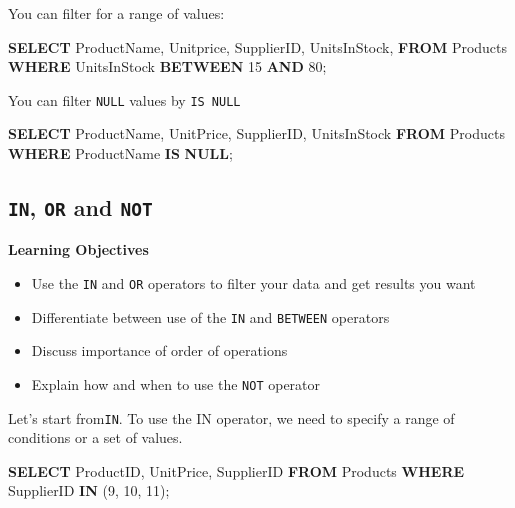 \documentclass[]{book}
\makeatletter
\newenvironment{Shaded}{\begin{snugshade}}{\end{snugshade}}
\newcommand{\KeywordTok}[1]{\textcolor[rgb]{0.13,0.29,0.53}{\textbf{{#1}}}}
\newcommand{\DecValTok}[1]{\textcolor[rgb]{0.00,0.00,0.81}{{#1}}}
\newcommand{\NormalTok}[1]{{#1}}
\providecommand{\tightlist}{%
  \setlength{\itemsep}{0pt}\setlength{\parskip}{0pt}}
\newenvironment{kframe}{%
\medskip{}
\setlength{\fboxsep}{.8em}
 \def\at@end@of@kframe{}%
 \ifinner\ifhmode%
  \def\at@end@of@kframe{\end{minipage}}%
  \begin{minipage}{\columnwidth}%
 \fi\fi%
 \def\FrameCommand##1{\hskip\@totalleftmargin \hskip-\fboxsep
 \colorbox{shadecolor}{##1}\hskip-\fboxsep
     \hskip-\linewidth \hskip-\@totalleftmargin \hskip\columnwidth}%
 \MakeFramed {\advance\hsize-\width
   \@totalleftmargin\z@ \linewidth\hsize
   \@setminipage}}%
 {\par\unskip\endMakeFramed%
 \at@end@of@kframe}
\renewenvironment{Shaded}{\begin{kframe}}{\end{kframe}}
\theoremstyle{definition}
\theoremstyle{definition}
\theoremstyle{remark}
\makeatother
\begin{document}
You can filter for a range of values:

\begin{Shaded}
\begin{Highlighting}[]
\KeywordTok{SELECT} \NormalTok{ProductName,}
\NormalTok{Unitprice,}
\NormalTok{SupplierID,}
\NormalTok{UnitsInStock,}
\KeywordTok{FROM} \NormalTok{Products}
\KeywordTok{WHERE} \NormalTok{UnitsInStock }\KeywordTok{BETWEEN} \DecValTok{15} \KeywordTok{AND} \DecValTok{80}\NormalTok{;}
\end{Highlighting}
\end{Shaded}

You can filter \texttt{NULL} values by \texttt{IS\ NULL}

\begin{Shaded}
\begin{Highlighting}[]
\KeywordTok{SELECT} \NormalTok{ProductName,}
\NormalTok{UnitPrice,}
\NormalTok{SupplierID,}
\NormalTok{UnitsInStock}
\KeywordTok{FROM} \NormalTok{Products}
\KeywordTok{WHERE} \NormalTok{ProductName }\KeywordTok{IS} \KeywordTok{NULL}\NormalTok{;}
\end{Highlighting}
\end{Shaded}

\subsection{\texorpdfstring{\texttt{IN}, \texttt{OR} and
\texttt{NOT}}{IN, OR and NOT}}\label{in-or-and-not}

\textbf{Learning Objectives}

\begin{itemize}
\tightlist
\item
  Use the \texttt{IN} and \texttt{OR} operators to filter your data and
  get results you want
\item
  Differentiate between use of the \texttt{IN} and \texttt{BETWEEN}
  operators
\item
  Discuss importance of order of operations
\item
  Explain how and when to use the \texttt{NOT} operator
\end{itemize}

Let's start from\texttt{IN}. To use the IN operator, we need to specify
a range of conditions or a set of values.

\begin{Shaded}
\begin{Highlighting}[]
\KeywordTok{SELECT}
\NormalTok{ProductID,}
\NormalTok{UnitPrice,}
\NormalTok{SupplierID}
\KeywordTok{FROM} \NormalTok{Products}
\KeywordTok{WHERE} \NormalTok{SupplierID }\KeywordTok{IN} \NormalTok{(}\DecValTok{9}\NormalTok{, }\DecValTok{10}\NormalTok{, }\DecValTok{11}\NormalTok{);}
\end{Highlighting}
\end{Shaded}
\end{document}
